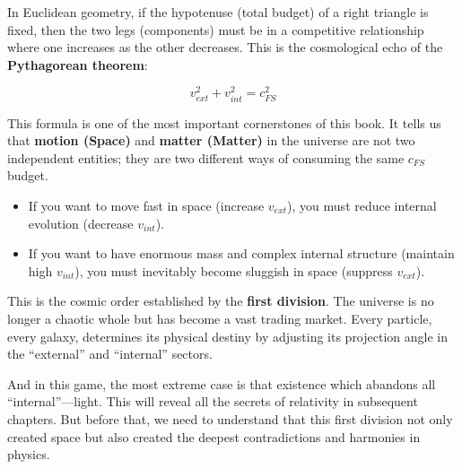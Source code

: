 In Euclidean geometry, if the hypotenuse (total budget) of a right triangle is fixed, then the two legs (components) must be in a competitive relationship where one increases as the other decreases. This is the cosmological echo of the \textbf{Pythagorean theorem}:

\[v_{ext}^2 + v_{int}^2 = c_{FS}^2\]

This formula is one of the most important cornerstones of this book. It tells us that \textbf{motion (Space)} and \textbf{matter (Matter)} in the universe are not two independent entities; they are two different ways of consuming the same $c_{FS}$ budget.

\begin{itemize}
\item If you want to move fast in space (increase $v_{ext}$), you must reduce internal evolution (decrease $v_{int}$).

\item If you want to have enormous mass and complex internal structure (maintain high $v_{int}$), you must inevitably become sluggish in space (suppress $v_{ext}$).
\end{itemize}

This is the cosmic order established by the \textbf{first division}. The universe is no longer a chaotic whole but has become a vast trading market. Every particle, every galaxy, determines its physical destiny by adjusting its projection angle in the ``external'' and ``internal'' sectors.

And in this game, the most extreme case is that existence which abandons all ``internal''---light. This will reveal all the secrets of relativity in subsequent chapters. But before that, we need to understand that this first division not only created space but also created the deepest contradictions and harmonies in physics.

